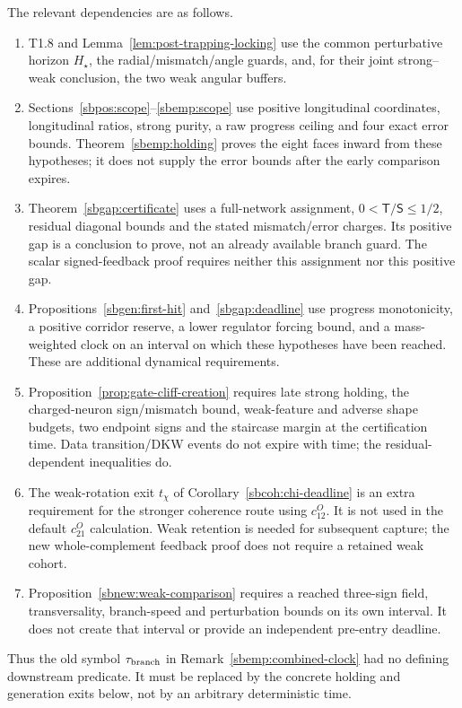\documentclass{article} %
\theoremstyle{plain}
\theoremstyle{definition}
\theoremstyle{remark}
\begin{document}
The relevant dependencies are as follows.
\begin{enumerate}
\item T1.8 and Lemma~\ref{lem:post-trapping-locking} use the common
perturbative horizon $H_\star$, the radial/mismatch/angle guards, and,
for their joint strong--weak conclusion, the two weak angular buffers.
\item Sections~\ref{sbpos:scope}--\ref{sbemp:scope} use positive
longitudinal coordinates, longitudinal ratios, strong purity, a raw
progress ceiling and four exact error bounds. Theorem~\ref{sbemp:holding}
proves the eight faces inward from these hypotheses; it does not supply
the error bounds after the early comparison expires.
\item Theorem~\ref{sbgap:certificate} uses a full-network assignment,
$0<\mathsf T/\mathsf S\le1/2$, residual diagonal bounds and the stated
mismatch/error charges. Its positive gap is a conclusion to prove, not
an already available branch guard. The scalar signed-feedback proof
requires neither this assignment nor this positive gap.
\item Propositions~\ref{sbgen:first-hit} and~\ref{sbgap:deadline} use
progress monotonicity, a positive corridor reserve, a lower regulator
forcing bound, and a mass-weighted clock on an interval on which these
hypotheses have been reached. These are additional dynamical requirements.
\item Proposition~\ref{prop:gate-cliff-creation} requires late strong
holding, the charged-neuron sign/mismatch bound, weak-feature and adverse
shape budgets, two endpoint signs and the staircase margin at the
certification time. Data transition/DKW events do not expire with time;
the residual-dependent inequalities do.
\item The weak-rotation exit $t_\chi$ of Corollary~\ref{sbcoh:chi-deadline}
is an extra requirement for the stronger coherence route using $c_{12}^O$.
It is not used in the default $c_{21}^O$ calculation. Weak retention is
needed for subsequent capture; the new whole-complement feedback proof
does not require a retained weak cohort.
\item Proposition~\ref{sbnew:weak-comparison} requires a reached
three-sign field, transversality, branch-speed and perturbation bounds
on its own interval. It does not create that interval or provide an
independent pre-entry deadline.
\end{enumerate}
Thus the old symbol $\tau_{\rm branch}$ in
Remark~\ref{sbemp:combined-clock} had no defining downstream predicate.
It must be replaced by the concrete holding and generation exits below,
not by an arbitrary deterministic time.
\end{document}
